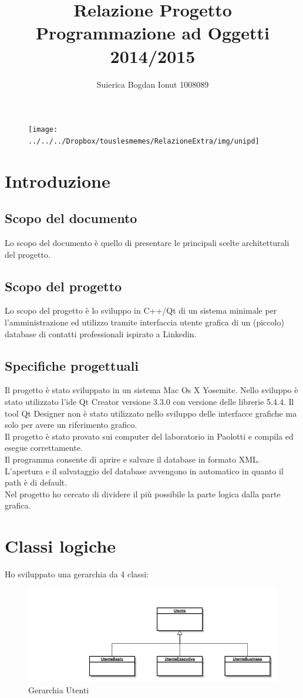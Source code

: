 \documentclass[11pt]{article}
\title{Relazione Progetto Programmazione ad Oggetti 2014/2015}
\author{Suierica Bogdan Ionut 1008089}
\begin{document}
	\maketitle
	\begin{figure}[h]
\centering
\texttt{[image: ../../../Dropbox/touslesmemes/RelazioneExtra/img/unipd]}

\end{figure}

	\newpage
	\section{Introduzione}
		\subsection{Scopo del documento}
		Lo scopo del documento è quello di presentare le principali scelte architetturali del progetto.
		\subsection{Scopo del progetto}
		Lo scopo del progetto è lo sviluppo in C++/Qt di un sistema minimale per l'amministrazione ed utilizzo tramite interfaccia utente grafica di un (piccolo) database di contatti professionali ispirato a Linkedin.
		\subsection{Specifiche progettuali}
		Il progetto è stato sviluppato in un sistema Mac Os X Yosemite. Nello sviluppo è stato utilizzato l'ide Qt Creator versione 3.3.0 con versione delle librerie 5.4.4. Il tool Qt Designer non è stato utilizzato nello sviluppo delle interfacce grafiche ma solo per avere un riferimento grafico. \\Il progetto è stato provato sui computer del laboratorio in Paolotti e compila ed esegue correttamente.\\
		Il programma consente di aprire e salvare il database in formato XML. L'apertura e il salvataggio del database avvengono in automatico in quanto il path è di default. \\
		Nel progetto ho cercato di dividere il più possibile la parte logica dalla parte grafica.
		\newpage
		
	\section{Classi logiche}
	Ho sviluppato una gerarchia da 4 classi: 
	\begin{figure}[h]
\centering
\includegraphics[width=0.8\linewidth]{gerarchiaUtente}
\caption{Gerarchia Utenti}
\label{fig:Gerarchia Utente}
	\end{figure}
	
\end{document}
